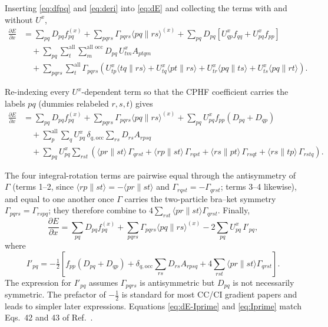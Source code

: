 \documentclass[12pt]{article}
\newcommand{\adb}[2]{\langle #1 \| #2 \rangle}
\newcommand{\so}{\text{all}}
\newcommand{\occ}{\text{occ}}
\newcommand{\alloc}{\text{all occ}}   %
\begin{document}
\noindent
Inserting \eqref{eq:dfpq} and \eqref{eq:deri} into \eqref{eq:dE} and collecting
the terms with and without $U^{x}$,
\begin{align}
\frac{\partial E}{\partial x}
&= \sum_{pq} D_{pq} f^{(x)}_{pq} + \sum_{pqrs}\Gamma_{pqrs}\adb{pq}{rs}^{(x)}
+ \sum_{pq} D_{pq}\left[U^x_{qp} f_{qq} + U^x_{pq} f_{pp}\right]
\nonumber\\
&\quad
+ \sum_{pq}\sum_{t}^{\so}\sum_{m}^{\alloc} D_{pq}\,U^x_{tm}A_{ptqm}
\nonumber\\
&\quad
+ \sum_{pqrs}\sum_{t}^{\so}\Gamma_{pqrs}\left(U^x_{tp}\adb{tq}{rs}
+ U^x_{tq}\adb{pt}{rs} + U^x_{tr}\adb{pq}{ts} + U^x_{ts}\adb{pq}{rt}\right).
\label{eq:collect}
\end{align}

\noindent
Re-indexing every $U^{x}$-dependent term so that the CPHF coefficient carries
the labels $pq$ (dummies relabeled $r,s,t$) gives
\begin{align}
\frac{\partial E}{\partial x}
&= \sum_{pq} D_{pq} f^{(x)}_{pq} + \sum_{pqrs}\Gamma_{pqrs}\adb{pq}{rs}^{(x)}
+ \sum_{pq} U^x_{pq} f_{pp}\left(D_{pq}+D_{qp}\right)
\nonumber\\
&\quad
+ \sum_{p}^{\so}\sum_{q} U^x_{pq}\,\delta_{q,\occ}\sum_{rs}
D_{rs}A_{rpsq}
\nonumber\\
&\quad
+ \sum_{pq} U^x_{pq}\sum_{rst}\left(
\adb{pr}{st}\,\Gamma_{qrst}
+ \adb{rp}{st}\,\Gamma_{rqst}
+ \adb{rs}{pt}\,\Gamma_{rsqt}
+ \adb{rs}{tp}\,\Gamma_{rstq}\right).
\label{eq:reindex}
\end{align}

\noindent
The four integral-rotation terms are pairwise equal through the antisymmetry of
$\Gamma$ (terms 1--2, since $\adb{rp}{st}=-\adb{pr}{st}$ and
$\Gamma_{rqst}=-\Gamma_{qrst}$; terms 3--4 likewise), and equal to one another
once $\Gamma$ carries the two-particle bra--ket symmetry
$\Gamma_{pqrs}=\Gamma_{rspq}$; they therefore combine to
$4\sum_{rst}\adb{pr}{st}\Gamma_{qrst}$.  Finally,
\begin{equation}
\frac{\partial E}{\partial x}
= \sum_{pq} D_{pq} f^{(x)}_{pq}
+ \sum_{pqrs}\Gamma_{pqrs}\adb{pq}{rs}^{(x)}
- 2\sum_{pq} U^x_{pq}\, I'_{pq},
\label{eq:dE-Iprime}
\end{equation}
where
\begin{equation}
I'_{pq} = -\tfrac{1}{2}\left[
f_{pp}\left(D_{pq}+D_{qp}\right)
+ \delta_{q,\occ}\sum_{rs} D_{rs}A_{rpsq}
+ 4\sum_{rst}\adb{pr}{st}\Gamma_{qrst}
\right].
\label{eq:Iprime}
\end{equation}
The expression for $I'_{pq}$ assumes $\Gamma_{pqrs}$ is antisymmetric but
$D_{pq}$ is not necessarily symmetric.  The prefactor of $-\tfrac{1}{2}$ is
standard for most CC/CI gradient papers and leads to simpler later expressions.
Equations \eqref{eq:dE-Iprime} and \eqref{eq:Iprime} match Eqs.~42 and 43 of
Ref.~.
\end{document}
